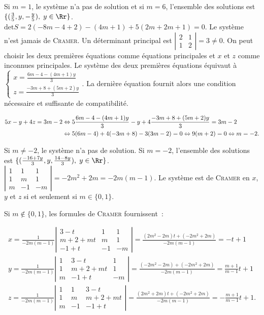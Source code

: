 {{Si $m=1$, le système n'a pas de solution et si $m=6$, l'ensemble des solutions est $\{(\frac{3}{5},y,-\frac{y}{5}),\;y\in\Rr\}$.
$\mbox{det}S=2(-8m-4+2)-(4m+1)+5(2m+2m+1)=0$. Le système n'est jamais de \textsc{Cramer}. Un déterminant principal est $\left|
\begin{array}{cc}
2&1\\
1&2
\end{array}
\right|=3\neq 0$. On peut choisir les deux premières équations comme équations principales et $x$ et $z$ comme inconnues principales. Le système des deux premières équations équivaut à $\left\{
\begin{array}{l}
x=\frac{6m-4-(4m+1)y}{3}\\
z=\frac{-3m+8+(5m+2)y}{3}
\end{array}
\right.$. La dernière équation fournit alors une condition nécessaire et suffisante de compatibilité.

\begin{align*}\ensuremath
5x-y+4z=3m-2&\Leftrightarrow5\frac{6m-4-(4m+1)y}{3}-y+4\frac{-3m+8+(5m+2)y}{3}=3m-2\\
 &\Leftrightarrow5(6m-4)+4(-3m+8)-3(3m-2)=0\Leftrightarrow9(m+2)=0\Leftrightarrow m=-2.
\end{align*}

Si $m\neq-2$, le système n'a pas de solution. Si $m=-2$, l'ensemble des solutions est $\{(\frac{-16+7y}{3},y,\frac{14-8y}{3}),\;y\in\Rr\}$.
$\left|
\begin{array}{ccc}
1&1&1\\
1&m&1\\
m&-1&-m
\end{array}\right|=-2m^2+2m=-2m(m-1)$. Le système est de \textsc{Cramer} en $x$, $y$ et $z$ si et seulement si $m\in\{0,1\}$.

Si $m\notin\{0,1\}$, les formules de \textsc{Cramer} fournissent~:

$$\begin{array}{l}
x=\frac{1}{-2m(m-1)}\left|
\begin{array}{ccc}
3-t&1&1\\
m+2+mt&m&1\\
-1+t&-1&-m
\end{array}\right|=\frac{(2m^2-2m)t+(-2m^2+2m)}{-2m(m-1)}=-t+1\\
y=\frac{1}{-2m(m-1)}\left|
\begin{array}{ccc}
1&3-t&1\\
1&m+2+mt&1\\
m&-1+t&-m
\end{array}\right|=\frac{(-2m^2-2m)+(-2m^2+2m)}{-2m(m-1)}=\frac{m+1}{m-1}t+1\\
z=\frac{1}{-2m(m-1)}\left|
\begin{array}{ccc}
1&1&3-t\\
1&m&m+2+mt\\
m&-1&-1+t
\end{array}\right|=\frac{(2m^2+2m)t+(-2m^2+2m)}{-2m(m-1)}=-\frac{m+1}{m-1}t+1.
\end{array}$$

}}
